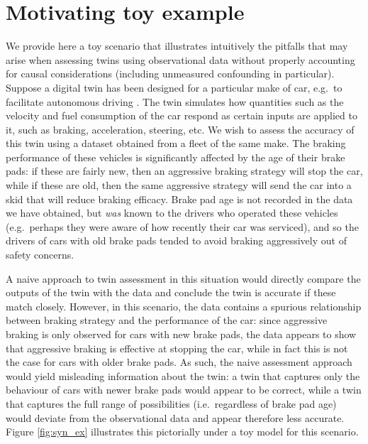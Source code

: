 \section{Motivating toy example} \label{sec:motivating-example}

%
%
We provide here a toy scenario that illustrates intuitively the pitfalls that may arise when assessing twins using observational data without properly accounting for causal considerations (including unmeasured confounding in particular).
%
Suppose a digital twin has been designed for a particular make of car, e.g.\ to facilitate autonomous driving \cite{allamaa2022sim2real}.
The twin simulates how quantities such as the velocity and fuel consumption of the car respond as certain inputs are applied to it, such as braking, acceleration, steering, etc.
We wish to assess the accuracy of this twin using a dataset obtained from a fleet of the same make.
The braking performance of these vehicles is significantly affected by the age of their brake pads: if these are fairly new, then an aggressive braking strategy will stop the car, while if these are old, then the same aggressive strategy will send the car into a skid that will reduce braking efficacy.
Brake pad age is not recorded in the data we have obtained, but \emph{was} known to the drivers who operated these vehicles (e.g.\ perhaps they were aware of how recently their car was serviced), and so the drivers of cars with old brake pads tended to avoid braking aggressively out of safety concerns.

%
%
%

A naive approach to twin assessment in this situation would directly compare the outputs of the twin with the data and conclude the twin is accurate if these match closely.
However, in this scenario, the data contains a spurious relationship between braking strategy and the performance of the car: since aggressive braking is only observed for cars with new brake pads, the data appears to show that aggressive braking is effective at stopping the car, while in fact this is not the case for cars with older brake pads.
As such, the naive assessment approach would yield misleading information about the twin: a twin that captures only the behaviour of cars with newer brake pads would appear to be correct, while a twin that captures the full range of possibilities (i.e.\ regardless of brake pad age) would deviate from the observational data and appear therefore less accurate.
%
%
Figure \ref{fig:syn_ex} illustrates this pictorially under a toy model for this scenario.

